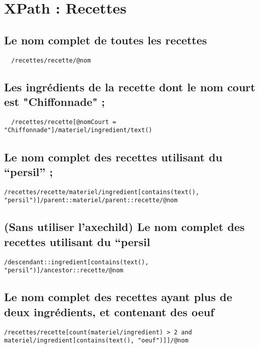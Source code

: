 \chapter{XPath : Recettes}

\section{Le nom complet de toutes les recettes}
\begin{verbatim}
  /recettes/recette/@nom
\end{verbatim}

\section{Les ingrédients de la recette dont le nom court est "Chiffonnade" ;}
\begin{verbatim}
  /recettes/recette[@nomCourt = "Chiffonnade"]/materiel/ingredient/text()
\end{verbatim}

\section{Le nom complet des recettes utilisant du “persil” ;}
\begin{verbatim}
/recettes/recette/materiel/ingredient[contains(text(), "persil")]/parent::materiel/parent::recette/@nom
\end{verbatim}

\section{(Sans utiliser l’axechild) Le nom complet des recettes utilisant du “persil}
\begin{verbatim}
/descendant::ingredient[contains(text(), "persil")]/ancestor::recette/@nom
\end{verbatim}

\section{Le nom complet des recettes ayant plus de deux ingrédients, et contenant des oeuf}
\begin{verbatim}
/recettes/recette[count(materiel/ingredient) > 2 and materiel/ingredient[contains(text(), "oeuf")]]/@nom
\end{verbatim}

